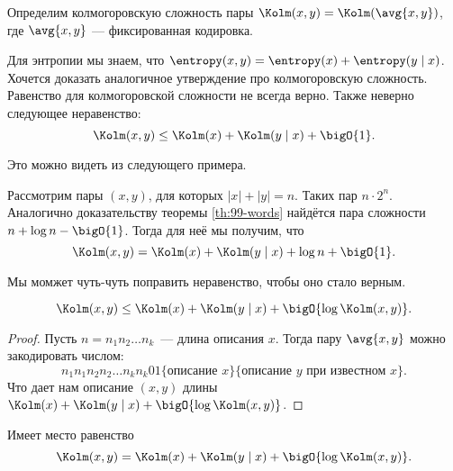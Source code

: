 \begin{definition}
    Определим колмогоровскую сложность пары $\Kolm(x, y) = \Kolm(\avg{x, y})$, где $\avg{x, y}$ ---
    фиксированная кодировка.
\end{definition}

Для энтропии мы знаем, что $\entropy(x, y) = \entropy(x) + \entropy(y \mid x)$. Хочется доказать
аналогичное утверждение про колмогоровскую сложность. Равенство для колмогоровской сложности не всегда
верно. Также неверно следующее неравенство:  
$$
    \Kolm(x, y) \le \Kolm(x) + \Kolm(y \mid x) + \bigO{1}.
$$
    
Это можно видеть из следующего примера.
\begin{example}
    Рассмотрим пары $(x, y)$, для которых $|x| + |y| = n$. Таких пар $n \cdot 2^n$. Аналогично
    доказательству теоремы \ref{th:99-words} найдётся пара сложности $n + \log n - \bigO{1}$. Тогда для
    неё мы получим, что  
    $$
        \Kolm(x, y) = \Kolm(x) + \Kolm(y \mid x) + \log n + \bigO{1}.
    $$
\end{example}

Мы момжет чуть-чуть поправить неравенство, чтобы оно стало верным.
\begin{theorem}
    $$
        \Kolm(x, y) \le \Kolm(x) + \Kolm(y \mid x) + \bigO{\log \Kolm(x, y)}.
    $$
\end{theorem}

\begin{proof}
    Пусть $n = n_1n_2\ldots n_k$~--- длина описания $x$. Тогда пару $\avg{x, y}$ можно закодировать
    числом:
    $$
        n_1n_1n_2n_2 \ldots n_kn_k01\{\text{описание } x\}\{\text{описание } y \text{ при известном $x$}\}.
    $$
    Что дает нам описание $(x, y)$ длины $\Kolm(x) + \Kolm(y \mid x) + \bigO{\log \Kolm(x, y)}$.
\end{proof}

\begin{theorem}
    Имеет место равенство 
    $$
        \Kolm(x, y) = \Kolm(x) + \Kolm(y \mid x) + \bigO{\log \Kolm(x, y)}.
    $$
\end{theorem}

